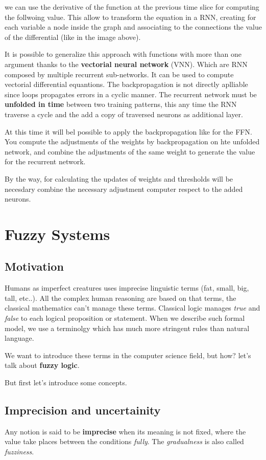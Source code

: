 \documentclass{article}
\begin{document}
we can use the derivative of the function at the previous time slice for computing the
follwoing value. This allow to transform the equation in a RNN, creating for each
variable a node inside the graph and associating to the connections the value of the differential
(like in the image above).

It is possible to generalize this approach with functions with more than one argument thanks
to the \textbf{vectorial neural network} (VNN). Which are RNN composed by multiple
recurrent sub-networks. It can be used to compute vectorial differential equantions.
The backpropagation is not directly aplliable since loops propagates errors in a cyclic manner.
The recurrent network must be \textbf{unfolded in time} between two training patterns, this
any time the RNN traverse a cycle and the add a copy of traversed neurons as additional layer.

At this time it will bel possible to apply the backpropagation like for the FFN.
You compute the adjustments of the weights by backpropagation on hte unfolded network, and
combine the adjustments of the same weight to generate the value for the recurrent network.

By the way, for calculating the updates of weights and thresholds will be necesdary combine the
necessary adjustment computer respect to the added neurons.

\section{Fuzzy Systems}
\subsection{Motivation}
Humans as imperfect creatures uses imprecise linguistic terms (fat, small, big, tall, etc..).
All the complex human reasoning are based on that terms, the classical mathematics can't manage
these terms.
Classical logic manages \textit{true} and \textit{false} to each logical proposition or statement.
When we describe such formal model, we use a terminolgy which has much more stringent rules than natural
language.

We want to introduce these terms in the computer science field, but how? let's
talk about \textbf{fuzzy logic}.

But first let's introduce some concepts.
\subsection{Imprecision and uncertainity}
Any notion is said to be \textbf{imprecise} when its meaning is not fixed, where the value
take places between the conditions \textit{fully}. The \textit{gradualness} is also called
\textit{fuzziness}.
\end{document}
